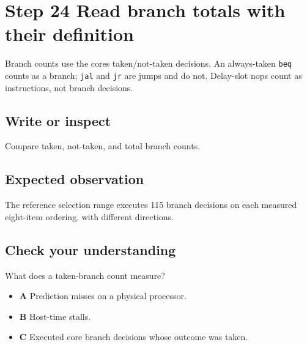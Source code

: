 \section{Step 24 Read branch totals with their
  definition}\label{009-sorting-visualizer-s24-step-24-read-branch-totals-with-their-definition}

Branch counts use the core\textquotesingle s taken/not-taken decisions.
An always-taken \texttt{beq} counts as a branch; \texttt{jal} and
\texttt{jr} are jumps and do not. Delay-slot nops count as instructions,
not branch decisions.

\subsection{Write or
  inspect}\label{009-sorting-visualizer-s24-write-or-inspect}

Compare taken, not-taken, and total branch counts.

\subsection{Expected
  observation}\label{009-sorting-visualizer-s24-expected-observation}

The reference selection range executes 115 branch decisions on each
measured eight-item ordering, with different directions.

\subsection{Check your
  understanding}\label{009-sorting-visualizer-s24-check-your-understanding}

What does a taken-branch count measure?

\begin{itemize}
  \tightlist
  \item
        \textbf{A} Prediction misses on a physical processor.
  \item
        \textbf{B} Host-time stalls.
  \item
        \textbf{C} Executed core branch decisions whose outcome was taken.
\end{itemize}
